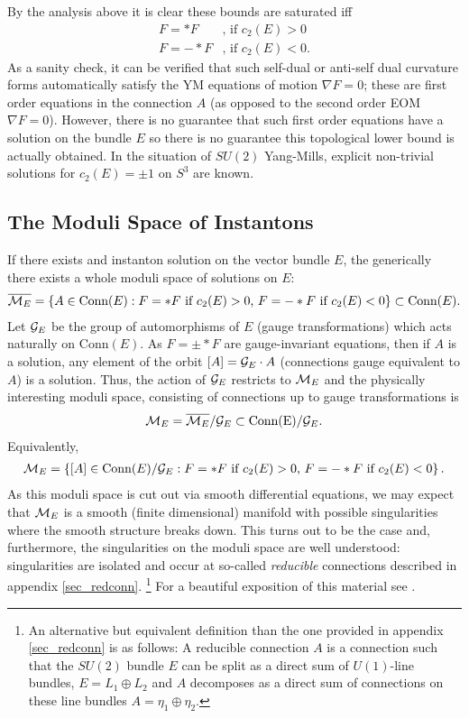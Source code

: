 \documentclass[12pt, onecolumn]{article}
\begin{document}
By the analysis above it is clear these bounds are saturated iff
\begin{align}
F=*F & \text{, if $c_{2}(E)>0$}\\
F=-*F & \text{, if $c_{2}(E)<0$}.
\label{eqn_instanton}
\end{align}
As a sanity check, it can be verified that such self-dual or anti-self dual curvature forms automatically satisfy the YM equations of motion $\nabla F =0$; these are first order equations in the connection $A$ (as opposed to the second order EOM $\nabla F=0$).  However, there is no guarantee that such first order equations have a solution on the bundle $E$ so there is no guarantee this topological lower bound is actually obtained.  In the situation of $SU(2)$ Yang-Mills, explicit non-trivial solutions for $c_{2}(E)=\pm 1$ on $S^3$ are known.

\subsection{The Moduli Space of Instantons}
If there exists and instanton solution on the vector bundle $E$, the generically there exists a whole moduli space of solutions on $E$:
\begin{align*}
\overline{{\cal M}_{E}}=\left \{A \in \text{Conn}(E):\text{$F=*F$ if $c_{2}(E)>0$, $F=-*F$ if $c_{2}(E)<0$} \right \} \subset \text{Conn}(E).
\end{align*}
Let ${\cal G}_{E}$ be the group of automorphisms of $E$ (gauge transformations) which acts naturally on $\text{Conn}(E)$.  As $F=\pm *F$ are gauge-invariant equations, then if $A$ is a solution, any element of the orbit $[A]={\cal G}_{E} \cdot A$ (connections gauge equivalent to $A$) is a solution.  Thus, the action of ${\cal G}_{E}$ restricts to ${\cal M}_{E}$ and the physically interesting moduli space, consisting of connections up to gauge transformations is
\begin{align*}
{\cal M}_{E}=\overline{{\cal M}_{E}}/{\cal G}_{E} \subset \text{Conn(E)}/{\cal G}_{E}.
\end{align*}
Equivalently,
\begin{align*}
{\cal M}_{E} = \left \{[A] \in \text{Conn}(E)/{\cal G}_{E}:\text{$F=*F$ if $c_{2}(E)>0$, $F=-*F$ if $c_{2}(E)<0$} \right \}.
\end{align*}
As this moduli space is cut out via smooth differential equations, we may expect that ${\cal M}_{E}$ is a smooth (finite dimensional) manifold with possible singularities where the smooth structure breaks down. This turns out to be the case and, furthermore, the singularities on the moduli space are well understood: singularities are isolated and occur at so-called \textit{reducible} connections described in appendix \ref{sec_redconn}. \footnote{An alternative but equivalent definition than the one provided in appendix \ref{sec_redconn} is as follows: A reducible connection $A$ is a connection such that the $SU(2)$ bundle $E$ can be split as a direct sum of $U(1)$-line bundles, $E=L_{1} \oplus L_{2}$ and $A$ decomposes as a direct sum of connections on these line bundles $A=\eta_{1} \oplus \eta_{2}$.}  For a beautiful exposition of this material see \cite{Freed_Uhlenbeck}.
\end{document}
